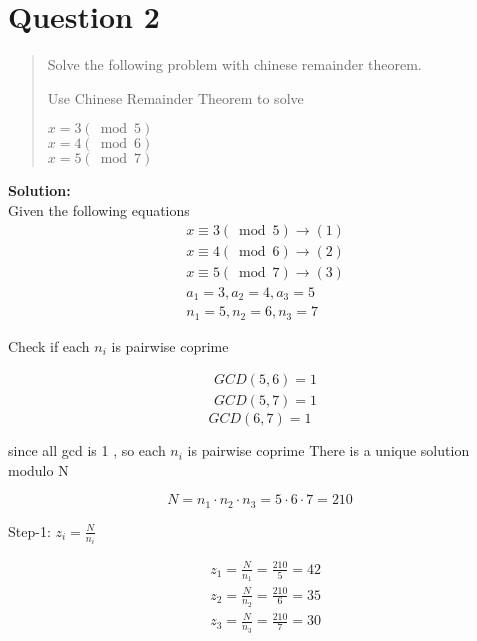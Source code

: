 \documentclass[11pt]{article}
\begin{document}
\section{Question 2}
\begin{quotation}
    Solve the following problem with chinese remainder theorem.

    Use Chinese Remainder Theorem to solve \\
    \begin{center}

        $x=3(\bmod 5)$\\
        $x=4(\bmod 6)$\\
        $x=5(\bmod 7)$\\

    \end{center}
\end{quotation}

\textbf{Solution:}\\

Given the following equations
$$
    \begin{aligned}
         & x \equiv 3(\bmod 5) \rightarrow(1) \\
         & x \equiv 4(\bmod 6) \rightarrow(2) \\
         & x \equiv 5(\bmod 7) \rightarrow(3) \\
         & a_1=3, a_2=4, a_3=5                \\
         & n_1=5, n_2=6, n_3=7
    \end{aligned}
$$

Check if each $n_i$ is pairwise coprime

$$
    \begin{aligned}
         & G C D(5,6)=1 \\
         & G C D(5,7)=1
    \end{aligned}
$$
$$
    G C D(6,7)=1
$$

since all gcd is 1 , so each $n_i$ is pairwise coprime
There is a unique solution modulo $\mathrm{N}$

$$
    N=n_1 \cdot n_2 \cdot n_3=5 \cdot 6 \cdot 7=210
$$

Step-1: $z_i=\frac{N}{n_i}$

$$
    \begin{aligned}
         & z_1=\frac{N}{n_1}=\frac{210}{5}=42 \\
         & z_2=\frac{N}{n_2}=\frac{210}{6}=35 \\
         & z_3=\frac{N}{n_3}=\frac{210}{7}=30
    \end{aligned}
$$
\end{document}
